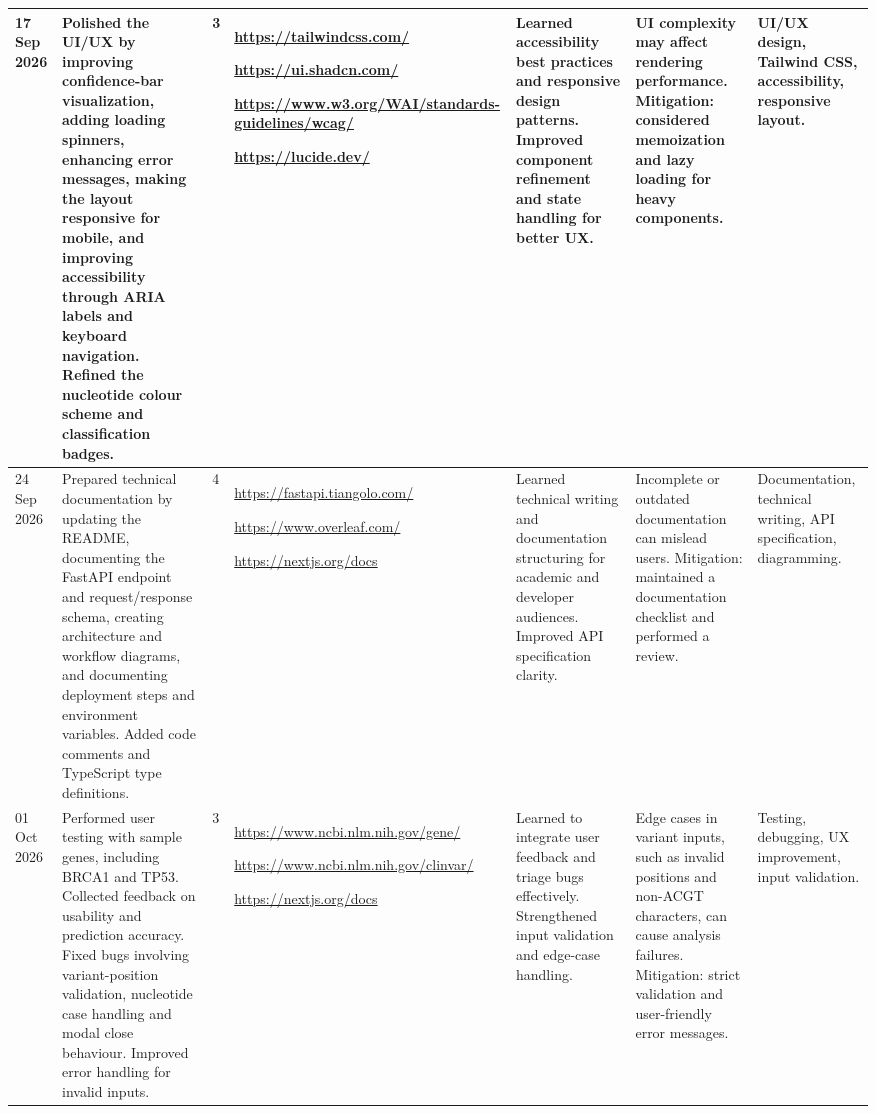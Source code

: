\documentclass[8pt,a4paper]{article}
\begin{document}
\begin{longtable}{|
    D{1.25cm}|
    D{4.10cm}|
    D{0.70cm}|
    D{2.90cm}|
    D{2.90cm}|
    D{3.00cm}|
    D{2.95cm}|
}
17 Sep 2026 &
Polished the UI/UX by improving confidence-bar visualization, adding loading spinners, enhancing error messages, making the layout responsive for mobile, and improving accessibility through ARIA labels and keyboard navigation. Refined the nucleotide colour scheme and classification badges. &
3 &
\url{https://tailwindcss.com/}
\par
\url{https://ui.shadcn.com/}
\par
\url{https://www.w3.org/WAI/standards-guidelines/wcag/}
\par
\url{https://lucide.dev/}
&
Learned accessibility best practices and responsive design patterns. Improved component refinement and state handling for better UX. &
UI complexity may affect rendering performance. Mitigation: considered memoization and lazy loading for heavy components. &
UI/UX design, Tailwind CSS, accessibility, responsive layout. \\
\hline

24 Sep 2026 &
Prepared technical documentation by updating the README, documenting the FastAPI endpoint and request/response schema, creating architecture and workflow diagrams, and documenting deployment steps and environment variables. Added code comments and TypeScript type definitions. &
4 &
\url{https://fastapi.tiangolo.com/}
\par
\url{https://www.overleaf.com/}
\par
\url{https://nextjs.org/docs}
&
Learned technical writing and documentation structuring for academic and developer audiences. Improved API specification clarity. &
Incomplete or outdated documentation can mislead users. Mitigation: maintained a documentation checklist and performed a review. &
Documentation, technical writing, API specification, diagramming. \\
\hline

01 Oct 2026 &
Performed user testing with sample genes, including BRCA1 and TP53. Collected feedback on usability and prediction accuracy. Fixed bugs involving variant-position validation, nucleotide case handling and modal close behaviour. Improved error handling for invalid inputs. &
3 &
\url{https://www.ncbi.nlm.nih.gov/gene/}
\par
\url{https://www.ncbi.nlm.nih.gov/clinvar/}
\par
\url{https://nextjs.org/docs}
&
Learned to integrate user feedback and triage bugs effectively. Strengthened input validation and edge-case handling. &
Edge cases in variant inputs, such as invalid positions and non-ACGT characters, can cause analysis failures. Mitigation: strict validation and user-friendly error messages. &
Testing, debugging, UX improvement, input validation. \\
\hline


\end{longtable}
\end{document}
